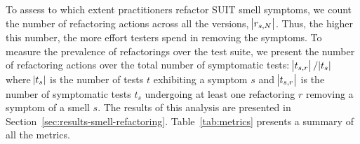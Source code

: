 
To assess to which extent practitioners refactor SUIT smell symptoms, we count the number of refactoring actions across all the versions, $\abs{r_{s,N}}$. Thus, the higher this number, the more effort testers spend in removing the symptoms. To measure the prevalence of refactorings over the test suite, we present the number of refactoring actions over the total number of symptomatic tests: $\abs{t_{s,r}} / \abs{t_{s}}$ where $\abs{t_{s}}$ is the number of tests $t$ exhibiting a symptom $s$ and $\abs{t_{s,r}}$ is the number of symptomatic tests $t_s$ undergoing at least one refactoring $r$ removing a symptom of a smell $s$. The results of this analysis are presented in Section~\ref{sec:results-smell-refactoring}. Table~\ref{tab:metrics} presents a summary of all the metrics.